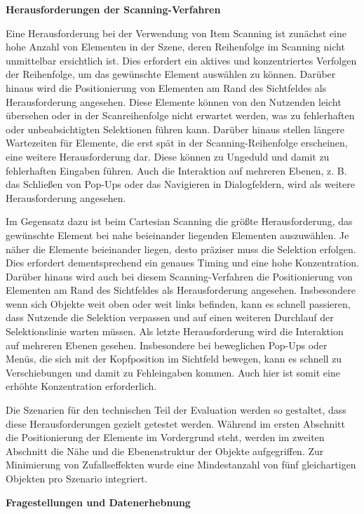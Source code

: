 \textbf{Herausforderungen der Scanning-Verfahren}

Eine Herausforderung bei der Verwendung von Item Scanning ist zunächst eine hohe Anzahl von Elementen in der Szene, deren Reihenfolge im Scanning nicht unmittelbar ersichtlich ist. Dies erfordert ein aktives und konzentriertes Verfolgen der Reihenfolge, um das gewünschte Element auswählen zu können. Darüber hinaus wird die Positionierung von Elementen am Rand des Sichtfeldes als Herausforderung angesehen. Diese Elemente können von den Nutzenden leicht übersehen oder in der Scanreihenfolge nicht erwartet werden, was zu fehlerhaften oder unbeabsichtigten Selektionen führen kann. Darüber hinaus stellen längere Wartezeiten für Elemente, die erst spät in der Scanning-Reihenfolge erscheinen, eine weitere Herausforderung dar. Diese können zu Ungeduld und damit zu fehlerhaften Eingaben führen. Auch die Interaktion auf mehreren Ebenen, z. B.  das Schließen von Pop-Ups oder das Navigieren in Dialogfeldern, wird als weitere Herausforderung angesehen.

Im Gegensatz dazu ist beim Cartesian Scanning die größte Herausforderung, das gewünschte Element bei nahe beieinander liegenden Elementen auszuwählen. Je näher die Elemente beieinander liegen, desto präziser muss die Selektion erfolgen. Dies erfordert dementsprechend ein genaues Timing und eine hohe Konzentration. Darüber hinaus wird auch bei diesem Scanning-Verfahren die Positionierung von Elementen am Rand des Sichtfeldes als Herausforderung angesehen. Insbesondere wenn sich Objekte weit oben oder weit links befinden, kann es schnell passieren, dass Nutzende die Selektion verpassen und auf einen weiteren Durchlauf der Selektionslinie warten müssen. Als letzte Herausforderung wird die Interaktion auf mehreren Ebenen gesehen. Insbesondere bei beweglichen Pop-Ups oder Menüs, die sich mit der Kopfposition im Sichtfeld bewegen, kann es schnell zu Verschiebungen und damit zu Fehleingaben kommen. Auch hier ist somit eine erhöhte Konzentration erforderlich. 

Die Szenarien für den technischen Teil der Evaluation werden so gestaltet, dass diese Herausforderungen gezielt getestet werden. Während im ersten Abschnitt die Positionierung der Elemente im Vordergrund steht, werden im zweiten Abschnitt die Nähe und die Ebenenstruktur der Objekte aufgegriffen. Zur Minimierung von Zufallseffekten wurde eine Mindestanzahl von fünf gleichartigen Objekten pro Szenario integriert.

\textbf{Fragestellungen und Datenerhebnung}

